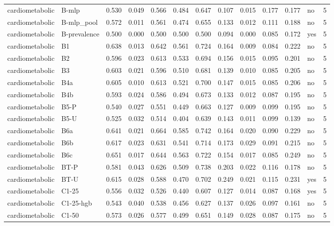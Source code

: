 \begin{table}[t]
\begin{tabular}{lllllllllllll}
cardiometabolic & B-mlp & 0.530 & 0.049 & 0.566 & 0.484 & 0.647 & 0.107 & 0.015 & 0.177 & 0.177 & no & 5 \\
cardiometabolic & B-mlp\_pool & 0.572 & 0.011 & 0.561 & 0.474 & 0.655 & 0.133 & 0.012 & 0.111 & 0.188 & no & 5 \\
cardiometabolic & B-prevalence & 0.500 & 0.000 & 0.500 & 0.500 & 0.500 & 0.094 & 0.000 & 0.085 & 0.172 & yes & 5 \\
cardiometabolic & B1 & 0.638 & 0.013 & 0.642 & 0.561 & 0.724 & 0.164 & 0.009 & 0.084 & 0.222 & no & 5 \\
cardiometabolic & B2 & 0.596 & 0.023 & 0.613 & 0.533 & 0.694 & 0.156 & 0.015 & 0.095 & 0.201 & no & 5 \\
cardiometabolic & B3 & 0.603 & 0.021 & 0.596 & 0.510 & 0.681 & 0.139 & 0.010 & 0.085 & 0.205 & no & 5 \\
cardiometabolic & B4a & 0.605 & 0.010 & 0.613 & 0.521 & 0.700 & 0.147 & 0.015 & 0.085 & 0.206 & no & 5 \\
cardiometabolic & B4b & 0.593 & 0.024 & 0.586 & 0.494 & 0.673 & 0.133 & 0.012 & 0.087 & 0.195 & no & 5 \\
cardiometabolic & B5-P & 0.540 & 0.027 & 0.551 & 0.449 & 0.663 & 0.127 & 0.009 & 0.099 & 0.195 & no & 5 \\
cardiometabolic & B5-U & 0.525 & 0.032 & 0.514 & 0.404 & 0.639 & 0.143 & 0.011 & 0.099 & 0.139 & no & 5 \\
cardiometabolic & B6a & 0.641 & 0.021 & 0.664 & 0.585 & 0.742 & 0.164 & 0.020 & 0.090 & 0.229 & no & 5 \\
cardiometabolic & B6b & 0.617 & 0.023 & 0.631 & 0.541 & 0.714 & 0.173 & 0.029 & 0.091 & 0.215 & no & 5 \\
cardiometabolic & B6c & 0.651 & 0.017 & 0.644 & 0.563 & 0.722 & 0.154 & 0.017 & 0.085 & 0.249 & no & 5 \\
cardiometabolic & BT-P & 0.581 & 0.043 & 0.626 & 0.509 & 0.738 & 0.203 & 0.022 & 0.116 & 0.178 & no & 5 \\
cardiometabolic & BT-U & 0.615 & 0.028 & 0.588 & 0.470 & 0.702 & 0.249 & 0.021 & 0.115 & 0.231 & yes & 5 \\
cardiometabolic & C1-25 & 0.556 & 0.032 & 0.526 & 0.440 & 0.607 & 0.127 & 0.014 & 0.087 & 0.168 & yes & 5 \\
cardiometabolic & C1-25-hgb & 0.543 & 0.040 & 0.538 & 0.456 & 0.627 & 0.137 & 0.026 & 0.097 & 0.161 & no & 5 \\
cardiometabolic & C1-50 & 0.573 & 0.026 & 0.577 & 0.499 & 0.651 & 0.149 & 0.028 & 0.087 & 0.175 & no & 5 \\

\end{tabular}
\end{table}
